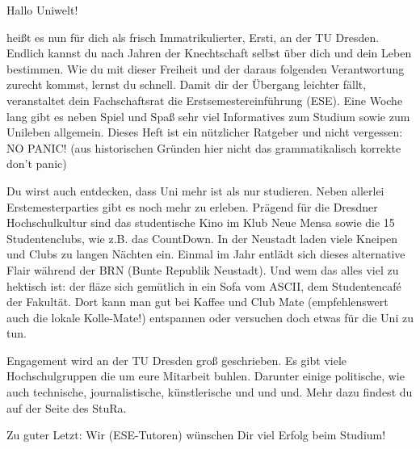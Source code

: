 

Hallo Uniwelt!

heißt es nun für dich als frisch Immatrikulierter, Ersti, an der TU Dresden. 
Endlich kannst du nach Jahren der Knechtschaft selbst über dich und dein Leben bestimmen. 
Wie du mit dieser Freiheit und der daraus folgenden Verantwortung zurecht kommst, lernst du schnell. 
Damit dir der Übergang leichter fällt, veranstaltet dein Fachschaftsrat die Erstsemestereinführung (ESE). 
Eine Woche lang gibt es neben Spiel und Spaß sehr viel Informatives zum Studium sowie zum Unileben allgemein. 
Dieses Heft ist ein nützlicher Ratgeber und nicht vergessen: 
NO PANIC! (aus historischen Gründen hier nicht das grammatikalisch korrekte \glqq don't panic\grqq)

Du wirst auch entdecken, dass Uni mehr ist als nur studieren. 
Neben allerlei Erstemesterparties gibt es noch mehr zu erleben. 
Prägend für die Dresdner Hochschulkultur sind das studentische Kino im Klub Neue Mensa sowie die 15 Studentenclubs, wie z.B. das CountDown. 
In der Neustadt laden viele Kneipen und Clubs zu langen Nächten ein. 
Einmal im Jahr entlädt sich dieses alternative Flair während der BRN (Bunte Republik Neustadt). 
Und wem das alles viel zu hektisch ist: der fläze sich gemütlich in ein Sofa vom ASCII, dem Studentencafé der Fakultät. 
Dort kann man gut bei Kaffee und Club Mate (empfehlenswert auch die lokale Kolle-Mate!) entspannen oder versuchen doch etwas für die Uni zu tun.

Engagement wird an der TU Dresden groß geschrieben. 
Es gibt viele Hochschulgruppen die um eure Mitarbeit buhlen. 
Darunter einige politische, wie auch technische, journalistische, künstlerische und und und. Mehr dazu findest du auf der Seite des StuRa.

Zu guter Letzt: Wir (ESE-Tutoren) wünschen Dir viel Erfolg beim Studium!